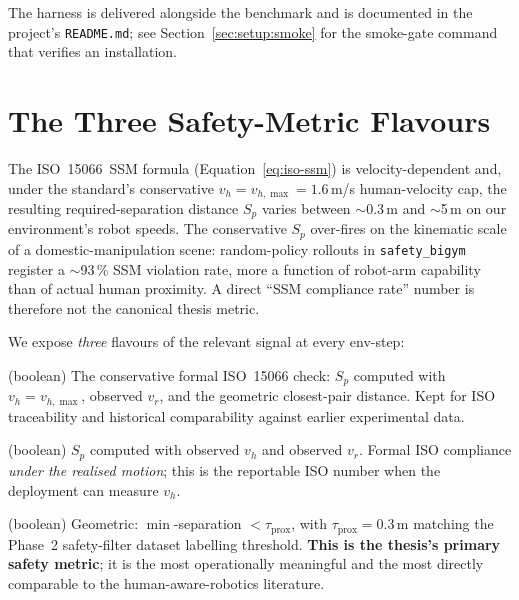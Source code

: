 \documentclass[11pt,a4paper]{report}
\newcommand{\ssm}{SSM}
\newcommand{\iso}{ISO~15066}
\newcommand{\sbigym}{\texttt{safety\_bigym}}
\begin{document}
The harness is delivered alongside the benchmark and is documented
in the project's \texttt{README.md}; see
Section~\ref{sec:setup:smoke} for the smoke-gate command that
verifies an installation.



\section{The Three Safety-Metric Flavours}
\label{sec:bench:metrics:flavours}

The \iso{}~\ssm{} formula (Equation~\ref{eq:iso-ssm}) is
velocity-dependent and, under the standard's conservative
$v_h = v_{h,\max} = 1.6$\,m/s human-velocity cap, the resulting
required-separation distance $S_p$ varies between $\sim$0.3\,m and
$\sim$5\,m on our environment's robot speeds. The conservative
$S_p$ over-fires on the kinematic scale of a domestic-manipulation
scene: random-policy rollouts in \sbigym{} register a $\sim$93\,\%
\ssm{} violation rate, more a function of robot-arm capability than
of actual human proximity. A direct ``\ssm{} compliance rate''
number is therefore not the canonical thesis metric.

We expose \emph{three} flavours of the relevant signal at every
env-step:

\begin{description}[leftmargin=2em]
\item[\texttt{ssm\_violation}] (boolean) The conservative formal
  \iso{} check: $S_p$ computed with $v_h = v_{h,\max}$, observed
  $v_r$, and the geometric closest-pair distance. Kept for ISO
  traceability and historical comparability against earlier
  experimental data.
\item[\texttt{ssm\_violation\_actual}] (boolean) $S_p$ computed
  with observed $v_h$ and observed $v_r$. Formal ISO compliance
  \emph{under the realised motion}; this is the reportable ISO
  number when the deployment can measure $v_h$.
\item[\texttt{proximity\_violation}] (boolean) Geometric: $\min$-separation
  $< \tau_{\mathrm{prox}}$, with $\tau_{\mathrm{prox}} = 0.3$\,m
  matching the Phase~2 safety-filter dataset labelling threshold.
  \textbf{This is the thesis's primary safety metric}; it is the
  most operationally meaningful and the most directly comparable to
  the human-aware-robotics literature.
\end{description}
\end{document}
